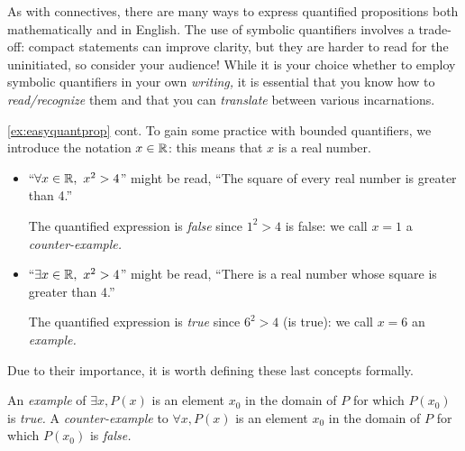 As with connectives, there are many ways to express quantified propositions both mathematically and in English. The use of symbolic quantifiers involves a trade-off: compact statements can improve clarity, but they are harder to read for the uninitiated, so consider your audience! While it is your choice whether to employ symbolic quantifiers in your own \emph{writing,} it is essential that you know how to \emph{read/recognize} them and that you can \emph{translate} between various incarnations.

\begin{example*}{\ref{ex:easyquantprop} cont.}{}
	To gain some practice with bounded quantifiers, we introduce the notation $x\in\mathbb{R}$: this means that $x$ is a real number.%
	\begin{itemize}
	  \item ``$\forall x\in\mathbb{R},\ x^2>4$'' might be read, ``The square of every real number is greater than 4.''\par
	  The quantified expression is \emph{false} since $1^2>4$ is false: we call $x=1$ a \emph{counter-example.}
	  \item ``$\exists x\in\mathbb{R},\ x^2>4$'' might be read, ``There is a real number whose square is greater than 4.''\par
	  The quantified expression is \emph{true} since $6^2>4$ (is true): we call $x=6$ an \emph{example.}
	\end{itemize}
\end{example*}

Due to their importance, it is worth defining these last concepts formally.

\begin{defn}{}{}
	An \emph{example} of $\exists x, P(x)$ is an element $x_0$ in the domain of $P$ for which $P(x_0)$ is \emph{true.}\smallbreak
	A \emph{counter-example} to $\forall x, P(x)$ is an element $x_0$ in the domain of $P$ for which $P(x_0)$ is \emph{false.}
\end{defn}


\goodbreak


% 



